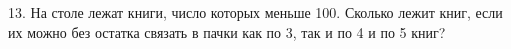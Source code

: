 13. На столе лежат книги, число которых меньше 100. Сколько лежит книг, если их можно без остатка связать в пачки как по 3, так и по 4 и по 5 книг?\\
